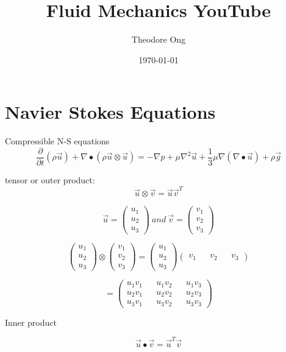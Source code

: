 \documentclass[11pt]{article}
\begin{document}
\title{Fluid Mechanics YouTube}
\author{Theodore Ong}
\date{\today}
\maketitle


\part{Navier Stokes Equations}

Compressible N-S equations
$$\frac{\partial}{\partial t}(\rho \vec{u}) + \nabla \bullet (\rho \vec{u} \otimes \vec{u})  = - \nabla p + \mu \nabla^2 \vec{u} + \frac{1}{3} \mu \nabla (\nabla \bullet \vec{u}) + \rho \vec{g}$$


tensor or outer product:
$$\vec{u} \otimes \vec{v} = \vec{u}\vec{v}^T$$

$$\vec{u}=\begin{pmatrix}
u_1 \\
u_2 \\
u_3 
\end{pmatrix} \ and\ 
\vec{v} = \begin{pmatrix}
v_1 \\
v_2 \\
v_3
\end{pmatrix}
$$


$$ \begin{pmatrix}
u_1 \\
u_2 \\
u_3 
\end{pmatrix} \otimes \begin{pmatrix}
v_1 \\
v_2 \\
v_3 
\end{pmatrix} = \begin{pmatrix}
u_1 \\
u_2 \\
u_3 
\end{pmatrix} \begin{pmatrix}
v_1 && v_2 && v_3
\end{pmatrix}
$$

$$= \begin{pmatrix}
u_1 v_1  && u_1 v_2 && u_1 v_3 \\
u_2  v_1 && u_2 v_2 && u_2 v_3 \\
u_3 v_1 && u_3 v_2 && u_3 v_3
\end{pmatrix}
$$

Inner product

$$\vec{u} \bullet \vec{v} = \vec{u}^T \vec{v}$$
\end{document}
